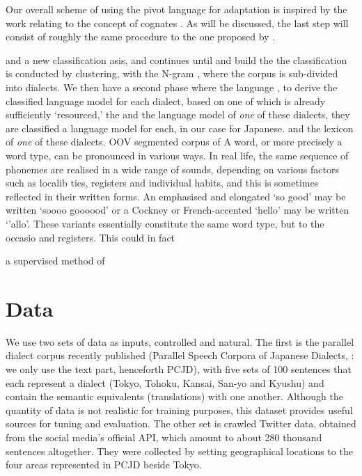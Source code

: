 \documentclass{article}
\begin{document}
\cite{}

Our overall scheme of using the pivot language for adaptation is inspired by the work relating to the concept of cognates \cite{Scherrer12}. As will be discussed, the last step will consist of roughly the same procedure to the one proposed by \cite{Scherrer12}. 


 and a new classification asis, and continues until   and build the    the classification is conducted by clustering, with the N-gram , where the corpus is sub-divided into dialects. We then have a second phase where the language , to derive the classified language model for each dialect, based on   one of which is already sufficiently `resourced,' the   and the language model of \emph{one} of these dialects, they are classified   a language model for each, in our case for Japanese.  and the lexicon of \emph{one} of these dialects.  OOV segmented corpus of  A word, or more precisely a word type, can be pronounced in various ways. In real life, the same sequence of phonemes are realised in a wide range of sounds, depending on various factors such as localib
ties, registers and individual habits, and this is sometimes reflected in their written forms. An emphasised and elongated `so good' may be written `soooo goooood' or a Cockney or French-accented `hello' may be written `'allo'. These variants essentially constitute the same word type, but to the  occasio and registers. This could in fact 

\cite{SaitoEtAl14}  a supervised method of


\section{Data}

We use two sets of data as inputs, controlled and natural. The first is the parallel dialect corpus recently published (Parallel Speech Corpora of Japanese Dialects, \cite{YoshinoEtAl16}: we only use the text part, henceforth PCJD), with five sets of 100 sentences that each represent a dialect (Tokyo, Tohoku, Kansai, San-yo and Kyushu) and contain the semantic equivalents (translations) with one another. Although the quantity of data is not realistic for training purposes, this dataset provides useful sources for tuning and evaluation. The other set is crawled Twitter data, obtained from the social media's official API, which amount to about 280 thousand sentences altogether. They were collected by setting geographical locations to the four areas represented in PCJD beside Tokyo. 
\end{document}
